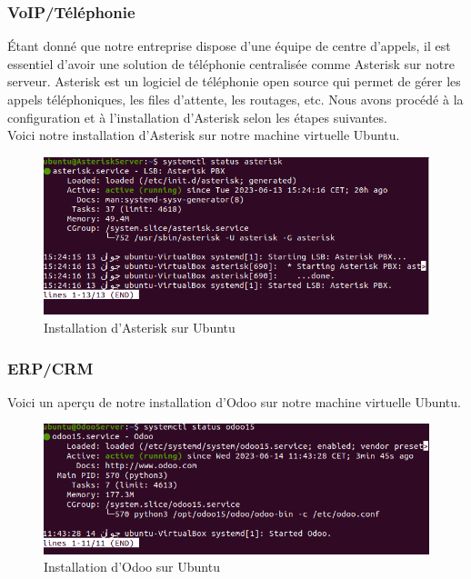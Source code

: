 \subsubsection{VoIP/Téléphonie}

Étant donné que notre entreprise dispose d'une équipe de centre d'appels, il est essentiel d'avoir une solution de téléphonie centralisée comme Asterisk sur notre serveur. Asterisk est un logiciel de téléphonie open source qui permet de gérer les appels téléphoniques, les files d'attente, les routages, etc. Nous avons procédé à la configuration et à l'installation d'Asterisk selon les étapes suivantes.\\

Voici notre installation d'Asterisk sur notre machine virtuelle Ubuntu. \\

\begin{figure}[H]
 \centering
    \includegraphics[width=15cm]{Images/AsteriskServer1.png}
    \caption{Installation d'Asterisk sur Ubuntu}
    \label{fig:asterisk-server1}
\end{figure}



\subsubsection{ERP/CRM}



Voici un aperçu de notre installation d'Odoo sur notre machine virtuelle Ubuntu. \\

\begin{figure}[H]
 \centering
    \includegraphics[width=15cm]{Images/OdooServer1.png}
    \caption{Installation d'Odoo sur Ubuntu}
    \label{fig:odoo-installation}
\end{figure}

